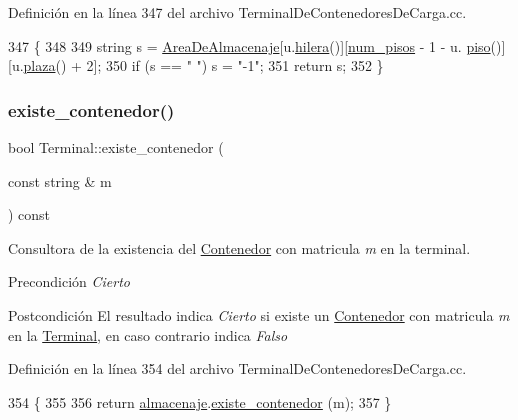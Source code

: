 Definición en la línea 347 del archivo Terminal\+De\+Contenedores\+De\+Carga.\+cc.


\begin{DoxyCode}
347                                                     \{
348     
349     \textcolor{keywordtype}{string} s = \hyperlink{class_terminal_a50670862a5cdeb0504efd1c45b6416dc}{AreaDeAlmacenaje}[u.\hyperlink{class_ubicacion_abf00d08075e75ac833de7357ebc6f521}{hilera}()][\hyperlink{class_terminal_ad6cdee7fe26b4443d45b0a18c345a86d}{num\_pisos} - 1 - u.
      \hyperlink{class_ubicacion_af6099f8de4dee993e4c9119e1f879070}{piso}()][u.\hyperlink{class_ubicacion_abed323ffb2eace375e80bc395fdaeb39}{plaza}() + 2];
350     \textcolor{keywordflow}{if} (s == \textcolor{stringliteral}{" "}) s = \textcolor{stringliteral}{"-1"};
351     \textcolor{keywordflow}{return} s;
352 \}
\end{DoxyCode}
\mbox{\label{class_terminal_a6b2cb1486f78ef82f759fb071bb1049d}} 
\subsubsection{\texorpdfstring{existe\+\_\+contenedor()}{existe\_contenedor()}}
{\footnotesize\ttfamily bool Terminal\+::existe\+\_\+contenedor (\begin{DoxyParamCaption}\item[{const string \&}]{m }\end{DoxyParamCaption}) const}



Consultora de la existencia del \hyperlink{class_contenedor}{Contenedor} con matricula {\itshape m} en la terminal. 

\begin{DoxyPrecond}{Precondición}
{\itshape Cierto} 
\end{DoxyPrecond}
\begin{DoxyPostcond}{Postcondición}
El resultado indica {\itshape Cierto} si existe un \hyperlink{class_contenedor}{Contenedor} con matricula {\itshape m} en la \hyperlink{class_terminal}{Terminal}, en caso contrario indica {\itshape Falso} 
\end{DoxyPostcond}


Definición en la línea 354 del archivo Terminal\+De\+Contenedores\+De\+Carga.\+cc.


\begin{DoxyCode}
354                                                        \{
355     
356     \textcolor{keywordflow}{return} \hyperlink{class_terminal_a1d87d7b16c4f460eee6f1ab73da90fd2}{almacenaje}.\hyperlink{class_almacenaje_aa846d1cf215bd139527d2607d4cee833}{existe\_contenedor} (m);
357 \}
\end{DoxyCode}
\mbox{\label{class_terminal_a3da2635443b21d89e5fecc47153a888f}} 
